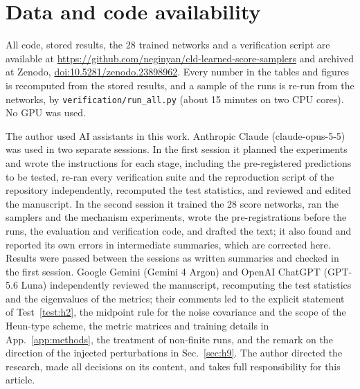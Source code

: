 \section*{Data and code availability}
All code, stored results, the 28 trained networks and a verification script are available at \url{https://github.com/neginyan/cld-learned-score-samplers} and archived at Zenodo, \href{https://doi.org/10.5281/zenodo.23898962}{doi:10.5281/zenodo.23898962}.
Every number in the tables and figures is recomputed from the stored results, and a sample of the runs is re-run from the networks, by \texttt{verification/run\_all.py} (about 15 minutes on two CPU cores).
No GPU was used.

\begin{acknowledgments}
The author used AI assistants in this work. Anthropic Claude (\mbox{claude-opus-5-5}) was used in two separate sessions. In the first session it planned the experiments and wrote the instructions for each stage, including the pre-registered predictions to be tested, re-ran every verification suite and the reproduction script of the repository independently, recomputed the test statistics, and reviewed and edited the manuscript. In the second session it trained the 28 score networks, ran the samplers and the mechanism experiments, wrote the pre-registrations before the runs, the evaluation and verification code, and drafted the text; it also found and reported its own errors in intermediate summaries, which are corrected here. Results were passed between the sessions as written summaries and checked in the first session. Google Gemini (Gemini 4 Argon) and OpenAI ChatGPT (GPT-5.6 Luna) independently reviewed the manuscript, recomputing the test statistics and the eigenvalues of the metrics; their comments led to the explicit statement of Test~\ref{test:h2}, the midpoint rule for the noise covariance and the scope of the Heun-type scheme, the metric matrices and training details in App.~\ref{app:methods}, the treatment of non-finite runs, and the remark on the direction of the injected perturbations in Sec.~\ref{sec:h9}.
The author directed the research, made all decisions on its content, and takes full responsibility for this article.
\end{acknowledgments}
